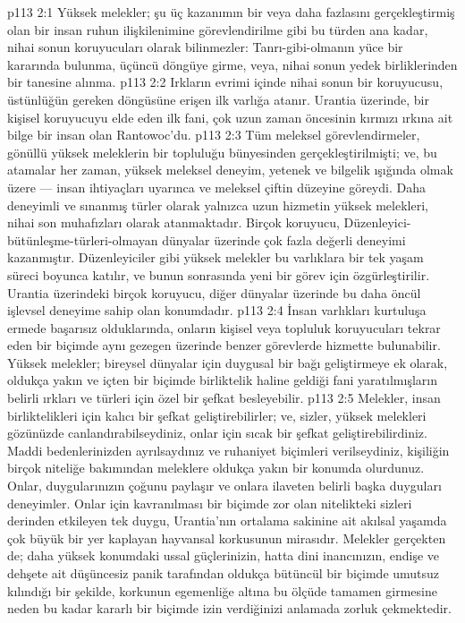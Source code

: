 \vs p113 2:1 Yüksek melekler; şu üç kazanımın bir veya daha fazlasını gerçekleştirmiş olan bir insan ruhun ilişkilenimine görevlendirilme gibi bu türden ana kadar, nihai sonun koruyucuları olarak bilinmezler: Tanrı\hyp{}gibi\hyp{}olmanın yüce bir kararında bulunma, üçüncü döngüye girme, veya, nihai sonun yedek birliklerinden bir tanesine alınma.
\vs p113 2:2 Irkların evrimi içinde nihai sonun bir koruyucusu, üstünlüğün gereken döngüsüne erişen ilk varlığa atanır. Urantia üzerinde, bir kişisel koruyucuyu elde eden ilk fani, çok uzun zaman öncesinin kırmızı ırkına ait bilge bir insan olan Rantowoc’du.
\vs p113 2:3 Tüm meleksel görevlendirmeler, gönüllü yüksek meleklerin bir topluluğu bünyesinden gerçekleştirilmişti; ve, bu atamalar her zaman, yüksek meleksel deneyim, yetenek ve bilgelik ışığında olmak üzere --- insan ihtiyaçları uyarınca ve meleksel çiftin düzeyine göreydi. Daha deneyimli ve sınanmış türler olarak yalnızca uzun hizmetin yüksek melekleri, nihai son muhafızları olarak atanmaktadır. Birçok koruyucu, Düzenleyici\hyp{}bütünleşme\hyp{}türleri\hyp{}olmayan dünyalar üzerinde çok fazla değerli deneyimi kazanmıştır. Düzenleyiciler gibi yüksek melekler bu varlıklara bir tek yaşam süreci boyunca katılır, ve bunun sonrasında yeni bir görev için özgürleştirilir. Urantia üzerindeki birçok koruyucu, diğer dünyalar üzerinde bu daha öncül işlevsel deneyime sahip olan konumdadır.
\vs p113 2:4 İnsan varlıkları kurtuluşa ermede başarısız olduklarında, onların kişisel veya topluluk koruyucuları tekrar eden bir biçimde aynı gezegen üzerinde benzer görevlerde hizmette bulunabilir. Yüksek melekler; bireysel dünyalar için duygusal bir bağı geliştirmeye ek olarak, oldukça yakın ve içten bir biçimde birliktelik haline geldiği fani yaratılmışların belirli ırkları ve türleri için özel bir şefkat besleyebilir.
\vs p113 2:5 Melekler, insan birliktelikleri için kalıcı bir şefkat geliştirebilirler; ve, sizler, yüksek melekleri gözünüzde canlandırabilseydiniz, onlar için sıcak bir şefkat geliştirebilirdiniz. Maddi bedenlerinizden ayrılsaydınız ve ruhaniyet biçimleri verilseydiniz, kişiliğin birçok niteliğe bakımından meleklere oldukça yakın bir konumda olurdunuz. Onlar, duygularınızın çoğunu paylaşır ve onlara ilaveten belirli başka duyguları deneyimler. Onlar için kavranılması bir biçimde zor olan nitelikteki sizleri derinden etkileyen tek duygu, Urantia’nın ortalama sakinine ait akılsal yaşamda çok büyük bir yer kaplayan hayvansal korkusunun mirasıdır. Melekler gerçekten de; daha yüksek konumdaki ussal güçlerinizin, hatta dini inancınızın, endişe ve dehşete ait düşüncesiz panik tarafından oldukça bütüncül bir biçimde umutsuz kılındığı bir şekilde, korkunun egemenliğe altına bu ölçüde tamamen girmesine neden bu kadar kararlı bir biçimde izin verdiğinizi anlamada zorluk çekmektedir.
